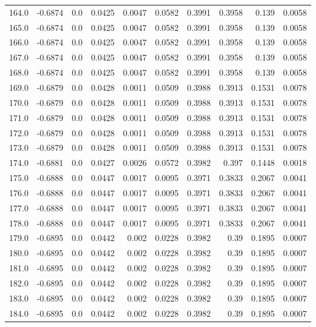 \begin{longtable}{lrrrrrrrrr}
164.0 & -0.6874 & 0.0 & 0.0425 & 0.0047 & 0.0582 & 0.3991 & 0.3958 & 0.139 & 0.0058 \\
165.0 & -0.6874 & 0.0 & 0.0425 & 0.0047 & 0.0582 & 0.3991 & 0.3958 & 0.139 & 0.0058 \\
166.0 & -0.6874 & 0.0 & 0.0425 & 0.0047 & 0.0582 & 0.3991 & 0.3958 & 0.139 & 0.0058 \\
167.0 & -0.6874 & 0.0 & 0.0425 & 0.0047 & 0.0582 & 0.3991 & 0.3958 & 0.139 & 0.0058 \\
168.0 & -0.6874 & 0.0 & 0.0425 & 0.0047 & 0.0582 & 0.3991 & 0.3958 & 0.139 & 0.0058 \\
169.0 & -0.6879 & 0.0 & 0.0428 & 0.0011 & 0.0509 & 0.3988 & 0.3913 & 0.1531 & 0.0078 \\
170.0 & -0.6879 & 0.0 & 0.0428 & 0.0011 & 0.0509 & 0.3988 & 0.3913 & 0.1531 & 0.0078 \\
171.0 & -0.6879 & 0.0 & 0.0428 & 0.0011 & 0.0509 & 0.3988 & 0.3913 & 0.1531 & 0.0078 \\
172.0 & -0.6879 & 0.0 & 0.0428 & 0.0011 & 0.0509 & 0.3988 & 0.3913 & 0.1531 & 0.0078 \\
173.0 & -0.6879 & 0.0 & 0.0428 & 0.0011 & 0.0509 & 0.3988 & 0.3913 & 0.1531 & 0.0078 \\
174.0 & -0.6881 & 0.0 & 0.0427 & 0.0026 & 0.0572 & 0.3982 & 0.397 & 0.1448 & 0.0018 \\
175.0 & -0.6888 & 0.0 & 0.0447 & 0.0017 & 0.0095 & 0.3971 & 0.3833 & 0.2067 & 0.0041 \\
176.0 & -0.6888 & 0.0 & 0.0447 & 0.0017 & 0.0095 & 0.3971 & 0.3833 & 0.2067 & 0.0041 \\
177.0 & -0.6888 & 0.0 & 0.0447 & 0.0017 & 0.0095 & 0.3971 & 0.3833 & 0.2067 & 0.0041 \\
178.0 & -0.6888 & 0.0 & 0.0447 & 0.0017 & 0.0095 & 0.3971 & 0.3833 & 0.2067 & 0.0041 \\
179.0 & -0.6895 & 0.0 & 0.0442 & 0.002 & 0.0228 & 0.3982 & 0.39 & 0.1895 & 0.0007 \\
180.0 & -0.6895 & 0.0 & 0.0442 & 0.002 & 0.0228 & 0.3982 & 0.39 & 0.1895 & 0.0007 \\
181.0 & -0.6895 & 0.0 & 0.0442 & 0.002 & 0.0228 & 0.3982 & 0.39 & 0.1895 & 0.0007 \\
182.0 & -0.6895 & 0.0 & 0.0442 & 0.002 & 0.0228 & 0.3982 & 0.39 & 0.1895 & 0.0007 \\
183.0 & -0.6895 & 0.0 & 0.0442 & 0.002 & 0.0228 & 0.3982 & 0.39 & 0.1895 & 0.0007 \\
184.0 & -0.6895 & 0.0 & 0.0442 & 0.002 & 0.0228 & 0.3982 & 0.39 & 0.1895 & 0.0007 \\

\end{longtable}

